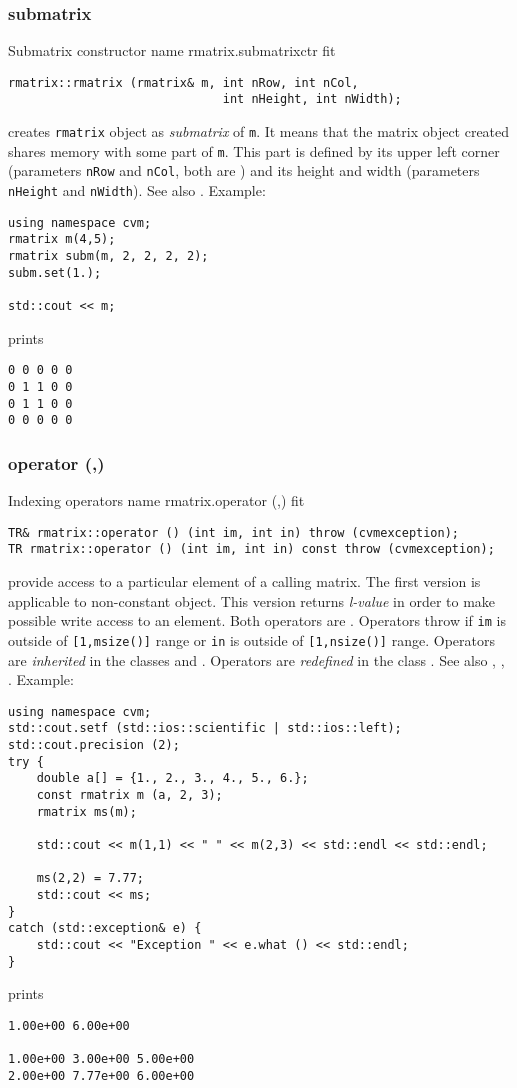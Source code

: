 \subsubsection{submatrix}
Submatrix constructor%
\pdfdest name {rmatrix.submatrixctr} fit
\begin{verbatim}
rmatrix::rmatrix (rmatrix& m, int nRow, int nCol,
                              int nHeight, int nWidth);
\end{verbatim}
creates  \verb"rmatrix" object as  \emph{submatrix} of \verb"m".
It means that the matrix object created shares  memory with some part
of \verb"m". This part is defined by its upper left corner (parameters
\verb"nRow" and \verb"nCol", both are \Based)
and its height and width (parameters
\verb"nHeight" and \verb"nWidth").
See also .
Example:
\begin{Verbatim}
using namespace cvm;
rmatrix m(4,5);
rmatrix subm(m, 2, 2, 2, 2);
subm.set(1.);

std::cout << m;
\end{Verbatim}
prints
\begin{Verbatim}
0 0 0 0 0
0 1 1 0 0
0 1 1 0 0
0 0 0 0 0
\end{Verbatim}
\newpage


\subsubsection{operator (,)}
Indexing operators%
\pdfdest name {rmatrix.operator (,)} fit
\begin{verbatim}
TR& rmatrix::operator () (int im, int in) throw (cvmexception);
TR rmatrix::operator () (int im, int in) const throw (cvmexception);
\end{verbatim}
provide access to a particular element of a calling matrix. The first version
is applicable to  non-constant object.
This version returns  \emph{l-value}
in order to make possible write access to an element.
Both operators are \Based.
Operators throw 
if \verb"im" is outside of \verb"[1,msize()]" range or
\verb"in" is outside of \verb"[1,nsize()]" range.
Operators are \emph{inherited}
in the classes
 and .
Operators are \emph{redefined}
in the class .
See also ,
,
.
Example:
\begin{Verbatim}
using namespace cvm;
std::cout.setf (std::ios::scientific | std::ios::left);
std::cout.precision (2);
try {
    double a[] = {1., 2., 3., 4., 5., 6.};
    const rmatrix m (a, 2, 3);
    rmatrix ms(m);

    std::cout << m(1,1) << " " << m(2,3) << std::endl << std::endl;

    ms(2,2) = 7.77;
    std::cout << ms;
}
catch (std::exception& e) {
    std::cout << "Exception " << e.what () << std::endl;
}
\end{Verbatim}
prints
\begin{Verbatim}
1.00e+00 6.00e+00

1.00e+00 3.00e+00 5.00e+00
2.00e+00 7.77e+00 6.00e+00
\end{Verbatim}
\newpage


